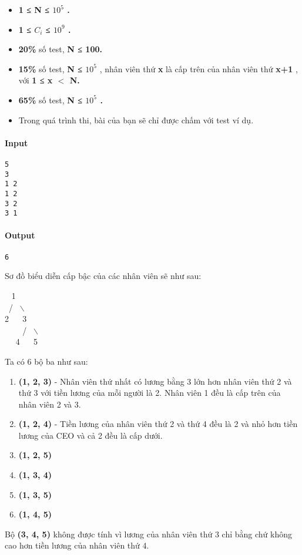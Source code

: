 \begin{itemize}
	\item \textbf{1 ≤ N ≤ $10^{5}$ . }
	\item \textbf{1 ≤ $C_{i}$ ≤ $10^{9}$ . }
	\item \textbf{20\% } số test, \textbf{ N ≤ 100. }
	\item \textbf{15\% } số test, \textbf{ N ≤ $10^{5}$} , nhân viên thứ \textbf{ x } là cấp trên của nhân viên thứ \textbf{ x+1 } , với \textbf{ 1 ≤ x $<$ N. }
	\item \textbf{65\% } số test, \textbf{ N ≤ $10^{5}$ . }
	\item Trong quá trình thi, bài của bạn sẽ chỉ được chấm với test ví dụ.
\end{itemize}
\paragraph{Input}
\begin{verbatim}
5
3
1 2
1 2
3 2
3 1\end{verbatim}

\paragraph{Output}
\begin{verbatim}
6\end{verbatim}
Sơ đồ biểu diễn cấp bậc của các nhân viên sẽ như sau:

  1
\\ /  $\backslash$
\\2    3
\\     /  $\backslash$
\\   4    5

Ta có 6 bộ ba như sau:
\begin{enumerate}
	\item \textbf{(1, 2, 3) } - Nhân viên thứ nhất có lương bằng 3 lớn hơn nhân viên thứ 2 và thứ 3 với tiền lương của mỗi người là 2. Nhân viên 1 đều là cấp trên của nhân viên 2 và 3.
	\item \textbf{(1, 2, 4) } - Tiền lương của nhân viên thứ 2 và thứ 4 đều là 2 và nhỏ hơn tiền lương của CEO và cả 2 đều là cấp dưới.
	\item \textbf{(1, 2, 5) }
	\item \textbf{(1, 3, 4) }
	\item \textbf{(1, 3, 5) }
	\item \textbf{(1, 4, 5) }
\end{enumerate}

Bộ \textbf{ (3, 4, 5) } không được tính vì lương của nhân viên thứ 3 chỉ bằng chứ không cao hơn tiền lương của nhân viên thứ 4.